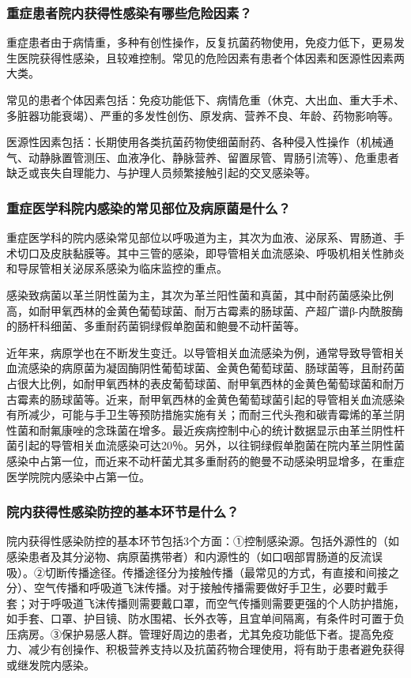 \subsubsection{重症患者院内获得性感染有哪些危险因素？}

重症患者由于病情重，多种有创性操作，反复抗菌药物使用，免疫力低下，更易发生医院获得性感染，且较难控制。常见的危险因素有患者个体因素和医源性因素两大类。

常见的患者个体因素包括：免疫功能低下、病情危重（休克、大出血、重大手术、多脏器功能衰竭）、严重的多发性创伤、原发病、营养不良、年龄、药物影响等。

医源性因素包括：长期使用各类抗菌药物使细菌耐药、各种侵入性操作（机械通气、动静脉置管测压、血液净化、静脉营养、留置尿管、胃肠引流等）、危重患者缺乏或丧失自理能力、与护理人员频繁接触引起的交叉感染等。

\subsubsection{重症医学科院内感染的常见部位及病原菌是什么？}

重症医学科的院内感染常见部位以呼吸道为主，其次为血液、泌尿系、胃肠道、手术切口及皮肤黏膜等。其中三管的感染，即导管相关血流感染、呼吸机相关性肺炎和导尿管相关泌尿系感染为临床监控的重点。

感染致病菌以革兰阴性菌为主，其次为革兰阳性菌和真菌，其中耐药菌感染比例高，如耐甲氧西林的金黄色葡萄球菌、耐万古霉素的肠球菌、产超广谱β-内酰胺酶的肠杆科细菌、多重耐药菌铜绿假单胞菌和鲍曼不动杆菌等。

近年来，病原学也在不断发生变迁。以导管相关血流感染为例，通常导致导管相关血流感染的病原菌为凝固酶阴性葡萄球菌、金黄色葡萄球菌、肠球菌等，且耐药菌占很大比例，如耐甲氧西林的表皮葡萄球菌、耐甲氧西林的金黄色葡萄球菌和耐万古霉素的肠球菌等。近来，耐甲氧西林的金黄色葡萄球菌引起的导管相关血流感染有所减少，可能与手卫生等预防措施实施有关；而耐三代头孢和碳青霉烯的革兰阴性菌和耐氟康唑的念珠菌在增多。最近疾病控制中心的统计数据显示由革兰阴性杆菌引起的导管相关血流感染可达20％。另外，以往铜绿假单胞菌在院内革兰阴性菌感染中占第一位，而近来不动杆菌尤其多重耐药的鲍曼不动感染明显增多，在重症医学院院内感染中占第一位。

\subsubsection{院内获得性感染防控的基本环节是什么？}

院内获得性感染防控的基本环节包括3个方面：①控制感染源。包括外源性的（如感染患者及其分泌物、病原菌携带者）和内源性的（如口咽部胃肠道的反流误吸）。②切断传播途径。传播途径分为接触传播（最常见的方式，有直接和间接之分）、空气传播和呼吸道飞沫传播。对于接触传播需要做好手卫生，必要时戴手套；对于呼吸道飞沫传播则需要戴口罩，而空气传播则需要更强的个人防护措施，如手套、口罩、护目镜、防水围裙、长外衣等，且宜单间隔离，有条件时可置于负压病房。③保护易感人群。管理好周边的患者，尤其免疫功能低下者。提高免疫力、减少有创操作、积极营养支持以及抗菌药物合理使用，将有助于患者避免获得或继发院内感染。

